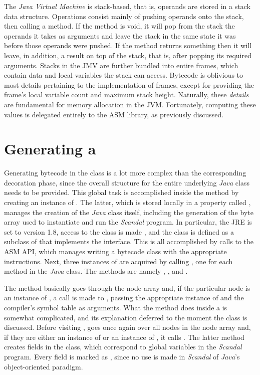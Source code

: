 The \emph{Java Virtual Machine} is stack-based, that is, operands are stored in a stack data structure. Operations consist mainly of pushing operands onto the stack, then calling a method. If the method is void, it will pop from the stack the operands it takes as arguments and leave the stack in the same state it was before those operands were pushed. If the method returns something then it will leave, in addition, a result on top of the stack, that is, after popping its required arguments. Stacks in the JMV are further bundled into entire frames, which contain data and local variables the stack can access. Bytecode is oblivious to most details pertaining to the implementation of frames, except for providing the frame's local variable count and maximum stack height. Naturally, these \emph{details} are fundamental for memory allocation in the JVM. Fortunately, computing these values is delegated entirely to the ASM library, as previously discussed.

\section{Generating a }

Generating bytecode in the  class is a lot more complex than the corresponding decoration phase, since the overall structure for the entire underlying \emph{Java} class needs to be provided. This global task is accomplished inside the  method by creating an instance of . The latter, which is stored locally in a property called , manages the creation of the \emph{Java} class itself, including the generation of the byte array used to instantiate and run the \emph{Scandal} program. In particular, the JRE is set to version 1.8, access to the class is made , and the class is defined as a subclass of  that implements the  interface. This is all accomplished by calls to the ASM API, which manages writing a bytecode class with the appropriate instructions. Next, three instances of  are acquired by calling , one for each method in the \emph{Java} class. The methods are namely , , and .

The  method basically goes through the node array and, if the particular node is an instance of , a call is made to , passing the appropriate instance of  and the compiler's symbol table as arguments. What the  method does inside a  is somewhat complicated, and its explanation deferred to the moment the  class is discussed. Before visiting ,  goes once again over all nodes in the node array and, if they are either an instance of  or an instance of , it calls . The latter method creates fields in the  class, which correspond to global variables in the \emph{Scandal} program. Every field is marked as , since no use is made in \emph{Scandal} of \emph{Java}'s object-oriented paradigm.

